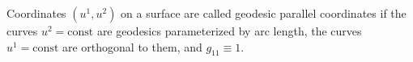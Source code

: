 Coordinates $(u^1, u^2)$ on a surface are called geodesic parallel coordinates if the curves $u^2 = \text{const}$ are geodesics parameterized by arc length, the curves $u^1 = \text{const}$ are orthogonal to them, and $g_{11} \equiv 1$.